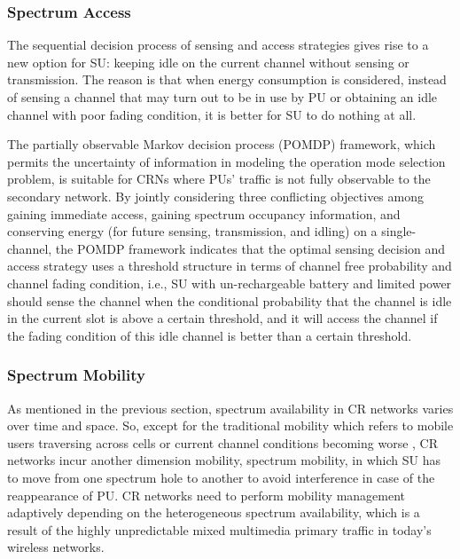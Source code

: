 \documentclass[journal,12pt,onecolumn]{IEEEtran}
\begin{document}
\subsubsection{Spectrum Access}
The sequential decision process of sensing and access strategies gives rise to a new option for SU: keeping idle on the current channel without sensing or transmission. The reason is that when energy consumption is considered, instead of sensing a channel that may turn out to be in use by PU or obtaining an idle channel with poor fading condition, it is better for SU to do nothing at all.



The partially observable Markov decision process (POMDP) framework, which permits the uncertainty of information in modeling the operation mode selection problem, is suitable for CRNs where PUs' traffic is not fully observable to the secondary network. By jointly considering three conflicting objectives among gaining immediate access, gaining spectrum occupancy information, and conserving energy (for future sensing, transmission, and idling) on a single-channel, the POMDP framework \cite{4663925} indicates that the optimal sensing decision and access strategy uses a threshold structure in terms of channel free probability and channel fading condition, i.e., SU with un-rechargeable battery and limited power should sense the channel when the conditional probability that the channel is idle in the current slot is above a certain threshold, and it will access the channel if the fading condition of this idle channel is better than a certain threshold.



\subsubsection{Spectrum Mobility}
As mentioned in the previous section, spectrum availability in CR networks varies over time and space. So, except for the traditional mobility which refers to mobile users traversing across cells or current channel conditions becoming worse \cite{doubleHandoff}, CR networks incur another dimension mobility, spectrum mobility, in which SU has to move from one spectrum hole to another to avoid interference in case of the reappearance of PU. CR networks need to perform mobility management adaptively depending on the heterogeneous spectrum availability, which is a result of the highly unpredictable mixed multimedia primary traffic in today's wireless networks.
\end{document}
